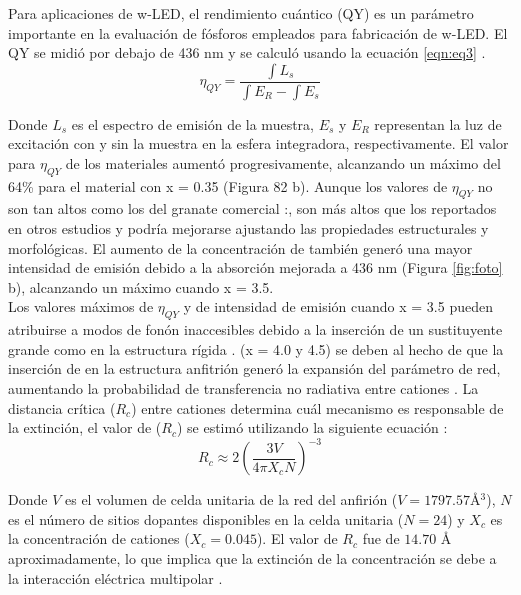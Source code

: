 Para aplicaciones de w-LED, el rendimiento cuántico (QY) es un parámetro
importante en la evaluación de fósforos empleados para fabricación de w-LED. El
QY se midió por debajo de 436 nm y se calculó usando la ecuación
\ref{eqn:eq3} \cite{Liu2013}.\\

\begin{equation}
    \eta_{QY} =\frac{\int L_s}{\int E_R-\int E_s}
    \label{eqn:eq3}
\end{equation}

Donde $L_s$ es el espectro de emisión de la muestra, $E_s$ y $E_R$ representan
la luz de excitación con y sin la muestra en la esfera integradora,
respectivamente. El
valor para $\eta_{QY}$ de los materiales aumentó progresivamente, alcanzando un
máximo del 64\% para el material con x = 0.35 (Figura 82 b). Aunque los valores
de
$\eta_{QY}$ no son tan altos como los del granate comercial
:,
son más altos que los reportados en otros estudios y podría mejorarse ajustando
las
propiedades estructurales y morfológicas. El aumento de la concentración de
 también generó una mayor intensidad de emisión debido a la
absorción
mejorada a 436 nm (Figura \ref{fig:foto} b), alcanzando un máximo cuando x =
3.5.\\

Los valores máximos de $\eta_{QY}$ y de intensidad de emisión cuando x = 3.5
pueden atribuirse a modos de fonón inaccesibles debido a la inserción de un
sustituyente grande como  en la estructura rígida
\cite{George2013}. (x = 4.0 y
4.5) se deben al hecho de que la inserción de  en la estructura
anfitrión generó la expansión del parámetro de red, aumentando la probabilidad
de transferencia
no radiativa entre cationes  \cite{Chen2015a}. La distancia crítica
($R_c$)
entre cationes  determina cuál mecanismo es responsable de la
extinción, el valor
de ($R_c$) se estimó utilizando la siguiente ecuación \cite{Blasse1968}:\\

\begin{equation}
    R_c \approx 2\left(\frac{3V}{4 \pi X_c N}\right)^{-3}
    \label{eqn:eq4}
\end{equation}

Donde $V$ es el volumen de celda unitaria de la red del anfirión
($V=1797.57$\r{A}$^3$), $N$ es el número de sitios dopantes disponibles en la
celda
unitaria ($N=24$) y $X_c$ es la concentración de cationes 
($X_c=0.045$). El
valor de $R_c$ fue de $14.70$ \r{A} aproximadamente, lo que implica que la
extinción de la
concentración se debe a la interacción eléctrica multipolar
\cite{Li2018,Hua2016}.\\

